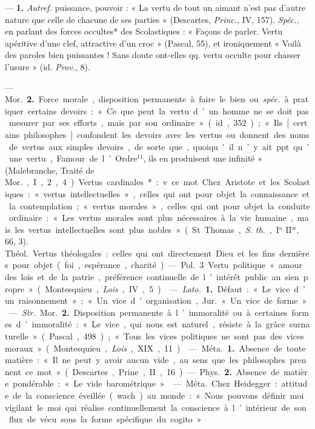 \begin{itemize}[leftmargin=1cm, label=, itemsep=1pt]
 — {\bf 1.} {\it Autref.} puissance, pouvoir : « La vertu de tout un aimant
n’est pas d’autre nature que celle de
chacune de ses parties » (Descartes,
{\it Princ.}, IV, 157). {\it Spéc.}, en parlant
des forces occultes* des Scolastiques :
« Façons de parler. Vertu apéritive
d'une clef, attractive d'un croc »
(Pascal, 55), et ironiquement
« Voilà des paroles bien puissantes !
Sans doute ont-elles qq. vertu
occulte pour chasser l'usure » (id.
{\it Prov.}, 8).

— \si{Mor.}  {\bf 2.} Force morale, disposition permanente à faire le bien ou
{\it spéc.} à pratiquer certains devoirs :
« Ce que peut la vertu d’un homme
ne se doit pas mesurer par ses efforts,
mais par son ordinaire » (id., 352) ;
« Ils [certains philosophes] confondent les devoirs avec les vertus ou
donnent des noms de vertus aux
simples devoirs, de sorte que, quoiqu'il n’y ait ppt. qu’une vertu,
Famour de l'Ordre$^{11}$, ils en produisent une infinité » (Malebranche,
Traité de \si{Mor.}, I, 2, 4). Vertus cardinales* : v. ce mot. Chez Aristote et
les Scolastiques : « vertus intellectuelles », celles qui ont pour objet
la connaissance et la contemplation;
« vertus morales », celles qui ont
pour objet la conduite ordinaire :
« Les vertus morales sont plus nécessaires à la vie humaine, mais les
vertus intellectuelles sont plus
nobles » (St. Thomas, {\it S. th.}, I$^\text{a}$ II$^\text{æ}$,
66, 3). \si{Théol.} Vertus théologales :
celles qui ont directement Dieu et
les fins dernières pour objet (foi,
espérance, charité).

— \si{Pol.} 3 Vertu politique
« amour des lois et de la patrie,...
préférence continuelle de l'intérêt
public au sien propre » (Montesquieu, {\it Lois}, IV, 5).

 — {\it Lato.} {\bf 1.} Défaut : « Le vice d’un
raisonnement »; « Un vice d’organisation, \si{Jur.} « Un vice de forme ».

— {\it Str.} \si{Mor.}  {\bf 2.} Disposition permanente à l’immoralité ou à certaines formes d’immoralité : « Le
vice, qui nous est naturel, résiste à la
grâce surnaturelle » (Pascal, 498) ;
« Tous les vices politiques ne sont
pas des vices moraux » (Montesquieu, {\it Lois}, XIX, 11).

 — \si{Méta.} {\bf 1.} Absence de toute
matière : « Il ne peut y avoir aucun
vide, au sens que les philosophes
prennent ce mot » (Descartes, Prine.,
II, 16). — \si{Phys.}  {\bf 2.} Absence de matière pondérable : « Le vide barométrique. »

 — \si{Méta.} Chez Heidegger :
attitude de la conscience éveillée
(wach) au monde : « Nous pouvons
définir moi vigilant le moi qui réalise continuellement la conscience
à l’intérieur de son flux de vécu
sous la forme spécifique du cogito. »


\end{itemize}
